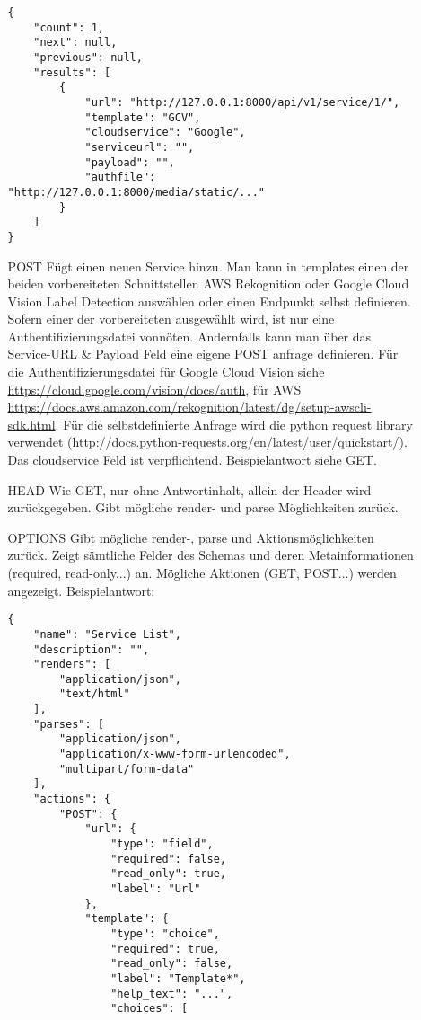 \begin{itemize}[align=parleft, labelsep=2cm, label={}, leftmargin=1cm]
\begin{enumerate}[align=parleft, labelsep=*, leftmargin=*]
\begin{verbatim}
{
    "count": 1,
    "next": null,
    "previous": null,
    "results": [
        {
            "url": "http://127.0.0.1:8000/api/v1/service/1/",
            "template": "GCV",
            "cloudservice": "Google",
            "serviceurl": "",
            "payload": "",
            "authfile": "http://127.0.0.1:8000/media/static/..."
        }
    ]
}
        \end{verbatim}
        \item[POST] Fügt einen neuen Service hinzu. Man kann in templates einen der beiden vorbereiteten Schnittstellen AWS Rekognition oder Google Cloud Vision Label Detection auswählen oder einen Endpunkt selbst definieren. Sofern einer der vorbereiteten ausgewählt wird, ist nur eine Authentifizierungsdatei vonnöten. Andernfalls kann man über das Service-URL \& Payload Feld eine eigene POST anfrage definieren. Für die Authentifizierungsdatei für Google Cloud Vision siehe \url{https://cloud.google.com/vision/docs/auth}, für AWS \url{https://docs.aws.amazon.com/rekognition/latest/dg/setup-awscli-sdk.html}. Für die selbstdefinierte Anfrage wird die python request library verwendet (\url{http://docs.python-requests.org/en/latest/user/quickstart/}). Das cloudservice Feld ist verpflichtend. Beispielantwort siehe GET.
        \item[HEAD] Wie GET, nur ohne Antwortinhalt, allein der Header wird zurückgegeben. Gibt mögliche render- und parse Möglichkeiten zurück.
        \item[OPTIONS] Gibt mögliche render-, parse und Aktionsmöglichkeiten zurück. Zeigt sämtliche Felder des Schemas und deren Metainformationen (required, read-only...) an. Mögliche Aktionen (GET, POST...) werden angezeigt. Beispielantwort:
\begin{verbatim}
{
    "name": "Service List",
    "description": "",
    "renders": [
        "application/json",
        "text/html"
    ],
    "parses": [
        "application/json",
        "application/x-www-form-urlencoded",
        "multipart/form-data"
    ],
    "actions": {
        "POST": {
            "url": {
                "type": "field",
                "required": false,
                "read_only": true,
                "label": "Url"
            },
            "template": {
                "type": "choice",
                "required": true,
                "read_only": false,
                "label": "Template*",
                "help_text": "...",
                "choices": [

\end{verbatim}
\end{enumerate}
\end{itemize}
